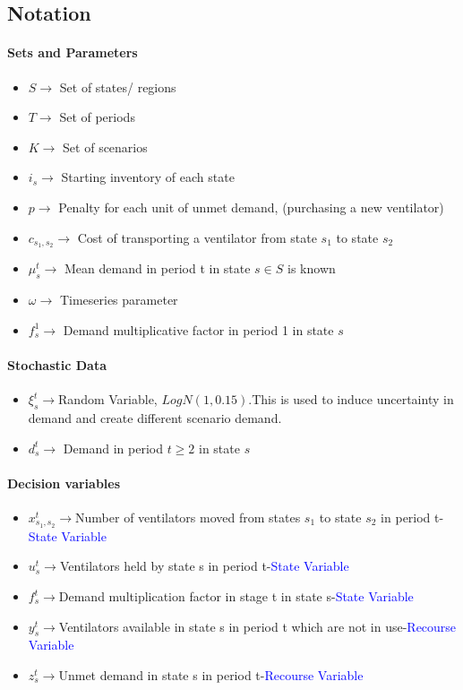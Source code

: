 \documentclass[11pt,letterpaper]{article}
\begin{document}
\subsection{Notation}
\paragraph{Sets and Parameters}
\begin{itemize}
    \item $S\rightarrow$ Set of states/ regions
    \item $T \rightarrow$ Set of periods
    \item $K \rightarrow$ Set of scenarios
   \item $i_s\rightarrow$ Starting inventory of each state 
   \item $p\rightarrow$ Penalty for each unit of unmet demand, (purchasing a new ventilator)
   \item $c_{s_1,s_2}\rightarrow$ Cost of transporting a ventilator from state $s_1$ to state $s_2$
   \item $\mu^t_s\rightarrow$ Mean demand in period t in state $s\in S$ is known
   \item $\omega \rightarrow$ Timeseries parameter
  \item $f^1_s\rightarrow$ Demand multiplicative factor in period 1 in state $s$

\end{itemize}

\paragraph{Stochastic Data}
\begin{itemize}
    \item $\xi^t_s \rightarrow$Random Variable, $LogN(1,0.15)$.This is used to induce uncertainty in demand and create different scenario demand.
   \item $d^t_s\rightarrow$ Demand in period $t\ge 2$ in state $s$
\end{itemize}

\paragraph{Decision variables}
\begin{itemize}
    \item $x^t_{s_1,s_2}\rightarrow$Number of ventilators moved from states $s_1$ to state $s_2$ in period t-\textcolor{blue}{State Variable}
    \item $u^t_s\rightarrow$Ventilators held by state s in period t-\textcolor{blue}{State Variable}
    \item $f^t_s\rightarrow$Demand multiplication factor in stage t in state s-\textcolor{blue}{State Variable}
    \item $y^t_s\rightarrow$Ventilators available in state s in period t which are not in use-\textcolor{blue}{Recourse Variable}
    \item $z^t_s\rightarrow$Unmet demand in state s in period t-\textcolor{blue}{Recourse Variable}
\end{itemize}
\end{document}
